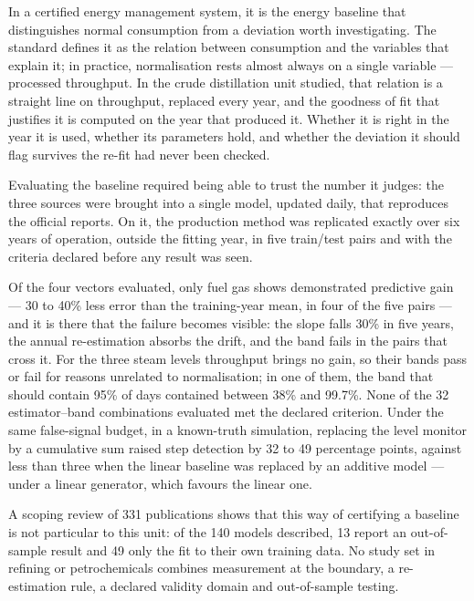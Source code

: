 
In a certified energy management system, it is the energy baseline that
distinguishes normal consumption from a deviation worth investigating. The
standard defines it as the relation between consumption and the variables
that explain it; in practice, normalisation rests almost always on a single
variable --- processed throughput. In the crude distillation unit studied,
that relation is a straight line on throughput, replaced every year, and the
goodness of fit that justifies it is computed on the year that produced it.
Whether it is right in the year it is used, whether its parameters hold, and
whether the deviation it should flag survives the re-fit had never been
checked.

Evaluating the baseline required being able to trust the number it judges:
the three sources were brought into a single model, updated daily, that
reproduces the official reports. On it, the production method was replicated
exactly over six years of operation, outside the fitting year, in five
train/test pairs and with the criteria declared before any result was seen.

Of the four vectors evaluated, only fuel gas shows demonstrated predictive
gain --- 30 to 40\% less error than the training-year mean, in four of the
five pairs --- and it is there that the failure becomes visible: the slope
falls 30\% in five years, the annual re-estimation absorbs the drift, and
the band fails in the pairs that cross it. For the three steam levels
throughput brings no gain, so their bands pass or fail for reasons unrelated
to normalisation; in one of them, the band that should contain 95\% of days
contained between 38\% and 99.7\%. None of the 32 estimator--band
combinations evaluated met the declared criterion. Under the same
false-signal budget, in a known-truth simulation, replacing the level
monitor by a cumulative sum raised step detection by 32 to 49 percentage
points, against less than three when the linear baseline was replaced by an
additive model --- under a linear generator, which favours the linear one.

A scoping review of 331 publications shows that this way of certifying a
baseline is not particular to this unit: of the 140 models described, 13
report an out-of-sample result and 49 only the fit to their own training
data. No study set in refining or petrochemicals combines measurement at the
boundary, a re-estimation rule, a declared validity domain and out-of-sample
testing.

